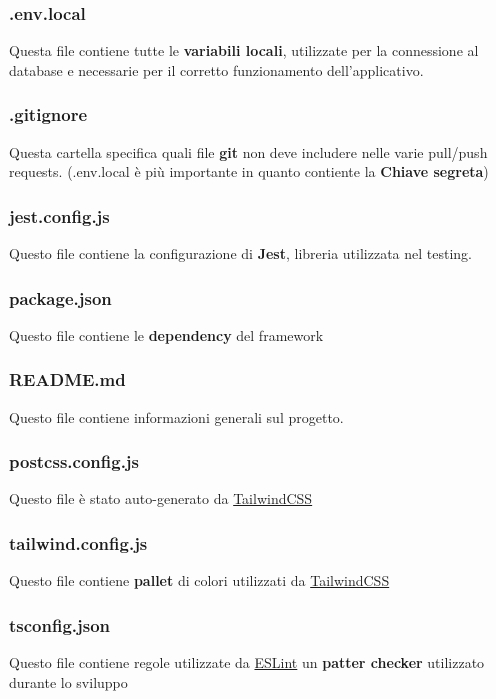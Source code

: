 \documentclass[11pt, a4paper]{article}
\theoremstyle{definition}
\begin{document}
\subsubsection{.env.local}
Questa file contiene tutte le \textbf{variabili locali}, utilizzate per la connessione al database e necessarie per il corretto funzionamento dell'applicativo.
\subsubsection{.gitignore}
Questa cartella specifica quali file \textbf{git} non deve includere nelle varie pull/push requests. (.env.local è più importante in quanto contiente la \textbf{Chiave segreta})
\subsubsection{jest.config.js}
Questo file contiene la configurazione di \textbf{Jest}, libreria utilizzata nel testing.
\subsubsection{package.json}
Questo file contiene le \textbf{dependency} del framework
\subsubsection{README.md}
Questo file contiene informazioni generali sul progetto.
\subsubsection{postcss.config.js}
Questo file è stato auto-generato da \href{https://tailwindcss.com/}{TailwindCSS}
\subsubsection{tailwind.config.js}
Questo file contiene \textbf{pallet} di colori utilizzati da \href{https://tailwindcss.com/}{TailwindCSS}
\subsubsection{tsconfig.json}
Questo file contiene regole utilizzate da \href{https://eslint.org/}{ESLint} un \textbf{patter checker} utilizzato durante lo sviluppo
  
\end{document}
